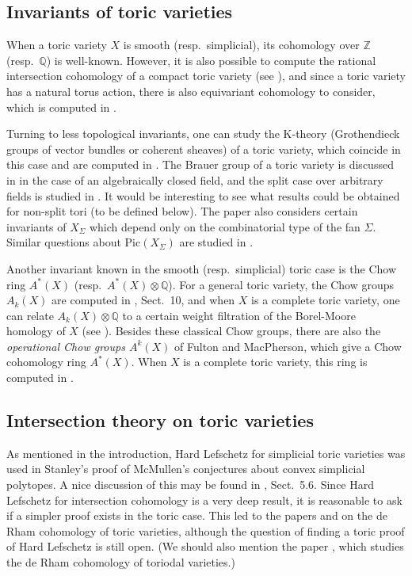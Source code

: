\documentclass{amsart}
\theoremstyle{plain}
\theoremstyle{definition}
\begin{document}
	\subsection{Invariants of toric varieties} When a toric
variety $X$ is smooth (resp.\ simplicial), its cohomology over $\mathbb{Z}$ (resp.\ $\mathbb{Q}$) is well-known.  However, it is also possible
to compute the rational intersection cohomology of a compact toric
variety (see \cite{Fie}), and since a toric variety has a natural
torus action, there is also equivariant cohomology to consider, which
is computed in \cite{Bif}.

	Turning to less topological invariants, one can study the
K-theory (Grothendieck groups of vector bundles or coherent sheaves)
of a toric variety, which coincide in this case and are computed in
\cite{More1}.  The Brauer group of a toric variety is discussed in
\cite{DFM} in the case of an algebraically closed field, and the split
case over arbitrary fields is studied in \cite{For}.  It would be
interesting to see what results could be obtained for non-split tori
(to be defined below).  The paper \cite{For} also considers certain
invariants of $X_\Sigma$ which depend only on the combinatorial type
of the fan $\Sigma$.  Similar questions about $\mathrm{Pic}(X_\Sigma)$
are studied in \cite{Eik}.

	Another invariant known in the smooth (resp.\ simplicial)
toric case is the Chow ring $A^*(X)$ (resp.\ $A^*(X)\otimes\mathbb{Q}$).
For a general toric variety, the Chow groups $A_k(X)$ are computed in
\cite{Dan2}, Sect.~10, and when $X$ is a complete toric variety,
one can relate $A_k(X)\otimes\mathbb{Q}$ to a certain weight filtration
of the Borel-Moore homology of $X$ (see \cite{Tot}).  Besides these
classical Chow groups, there are also the {\it operational Chow groups
$A^k(X)$\/} of Fulton and MacPherson, which give a Chow cohomology
ring $A^*(X)$.  When $X$ is a complete toric variety, this ring is
computed in \cite{FS}.

	\subsection{Intersection theory on toric varieties} As
mentioned in the introduction, Hard Lefschetz for simplicial toric
varieties was used in Stanley's proof of McMullen's conjectures about
convex simplicial polytopes.  A nice discussion of this may be found
in \cite{Ful}, Sect.~5.6.  Since Hard Lefschetz for intersection
cohomology is a very deep result, it is reasonable to ask if a simpler
proof exists in the toric case.  This led to the papers \cite{Oda1}
and \cite{Oda4} on the de Rham cohomology of toric varieties, although
the question of finding a toric proof of Hard Lefschetz is still open.
(We should also mention the paper \cite{Dan1}, which studies the de
Rham cohomology of toriodal varieties.)
\end{document}
